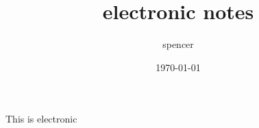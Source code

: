 \documentclass[UTF8]{ctexart}
\title{electronic notes}
\author{spencer}
\date{\today}
\begin{document}
This is electronic
\end{document}
